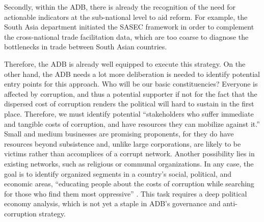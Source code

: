 \documentclass[12pt]{article}
\begin{document}
Secondly, within the ADB, there is already the recognition of the need for actionable indicators at the sub-national level to aid reform. For example, the South Asia department initiated the SASEC framework in order to complement the cross-national trade facilitation data, which are too coarse to diagnose the bottlenecks in trade between South Asian countries.

Therefore, the ADB is already well equipped to execute this strategy. On the other hand, the ADB needs a lot more deliberation is needed to identify potential entry points for this approach. Who will be our basic constituencies? Everyone is affected by corruption, and thus a potential supporter if not for the fact that the dispersed cost of corruption renders the political will hard to sustain in the first place. Therefore, we must identify potential ``stakeholders who suffer immediate and tangible costs of corruption, and have resources they can mobilize against it.'' Small and medium businesses are promising proponents, for they do have resources beyond subsistence and, unlike large corporations, are likely to be victims rather than accomplices of a corrupt network. Another possibility lies in existing networks, such as religious or communal organizations. In any case, the goal is to identify organized segments in a country's social, political, and economic areas, ``educating people about the costs of corruption while searching for those who find them most oppressive'' \citep[7]{Johnston2002}. This task requires a deep political economy analysis, which is not yet a staple in ADB's governance and anti-corruption strategy.

\newpage


\end{document}

